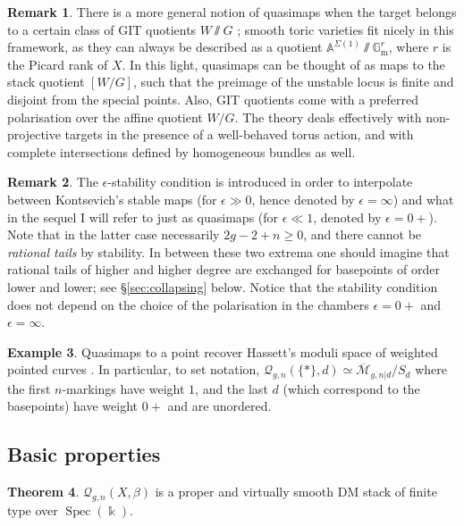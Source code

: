 \documentclass[11pt]{amsart}
\newcommand{\oM}{\overline{\mathcal{M}}}
\newcommand{\Q}[4]{\mathcal{Q}_{#1,#2}(#3,#4)}
\newcommand{\Aaff}{\mathbb{A}}
\newcommand{\kk}{\Bbbk}
\newcommand{\Spec}{\operatorname{Spec}}
\newcommand{\Gm}{\mathbb{G}_{\text{m}}}
\theoremstyle{definition}
\newtheorem{thm}{Theorem}[section]
\theoremstyle{definition}
\newtheorem{ex}[thm]{Example}
\newtheorem{rmk}[thm]{Remark}
\newcommand{\ilemph}[1]{\emph{#1}}
\begin{document}
\begin{rmk}
 There is a more general notion of quasimaps when the target belongs to a certain class of GIT quotients $W\sslash G$ \cite{CFKM}; smooth toric varieties fit nicely in this framework, as they can always be described as a quotient $\Aaff^{\Sigma(1)}\sslash\Gm^r$, where $r$ is the Picard rank of $X$. In this light, quasimaps can be thought of as maps to the stack quotient $[W/G]$, such that the preimage of the unstable locus is finite and disjoint from the special points. Also, GIT quotients come with a preferred polarisation over the affine quotient $W/G$. The theory deals effectively with non-projective targets in the presence of a well-behaved torus action, and with complete intersections defined by homogeneous bundles as well.
\end{rmk}
\begin{rmk}
 The $\epsilon$-stability condition is introduced in order to interpolate between Kontsevich's stable maps (for $\epsilon\gg 0$, hence denoted by $\epsilon=\infty$) and what in the sequel I will refer to just as quasimaps (for $\epsilon\ll1$, denoted by $\epsilon=0+$). Note that in the latter case necessarily $2g-2+n \geq 0$, and there cannot be \ilemph{rational tails} by stability. In between these two extrema one should imagine that rational tails of higher and higher degree are exchanged for basepoints of order lower and lower; see \S \ref{sec:collapsing} below. Notice that the stability condition does not depend on the choice of the polarisation in the chambers $\epsilon=0+$ \cite[Lemma 3.1.3]{CF-K} and $\epsilon=\infty$.
\end{rmk}

\begin{ex}\label{ex:qm_to_pt}
 Quasimaps to a point recover Hassett's moduli space of weighted pointed curves \cite{Hassett}. In particular, to set notation, $\Q{g}{n}{\{*\}}{d}\simeq \oM_{g,n|d}/S_d$ where the first $n$-markings have weight $1$, and the last $d$ (which correspond to the basepoints) have weight $0+$ and are unordered.
\end{ex}

\subsection{Basic properties}\begin{thm}\cite[Theorems 3.2.1 and 4.0.1]{CF-K}
 $\Q{g}{n}{X}{\beta}$ is a proper and virtually smooth DM stack of finite type over $\Spec(\kk)$.
\end{thm}
\end{document}
